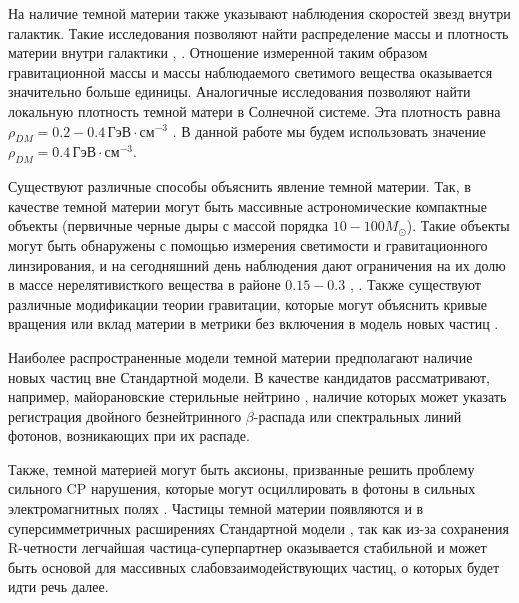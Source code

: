 На наличие темной материи также указывают наблюдения скоростей звезд внутри галактик. Такие исследования позволяют найти распределение массы и плотность материи внутри галактики \cite{Radial_velocity_measurements}, \cite{Angular_Velocity}. Отношение измеренной таким образом гравитационной массы и массы наблюдаемого светимого вещества оказывается значительно больше единицы. Аналогичные исследования позволяют найти локальную плотность темной матери в Солнечной системе. Эта плотность равна $\rho_{DM} = 0.2 - 0.4 \, \text{ГэВ} \cdot \text{см}^{-3}$ \cite{palau2022oblateness}. В данной работе мы будем использовать значение  $\rho_{DM} = 0.4 \,\text{ГэВ} \cdot  	\text{см}^{-3}$.


Существуют различные способы объяснить явление темной материи. Так, в качестве темной материи могут быть массивные астрономические компактные объекты (первичные черные дыры с массой порядка $10-100M_{\odot}$). Такие объекты могут быть обнаружены с помощью измерения светимости и гравитационного линзирования, и на сегодняшний день наблюдения дают ограничения на их долю в массе нерелятивисткого вещества в районе $0.15-0.3$ \cite{Zumalac_rregui_2018}, \cite{Blaineau_2022}.
Также существуют различные модификации теории гравитации, которые могут объяснить кривые вращения или вклад материи в метрики без включения в модель новых частиц \cite{1984ApJ...286....7B}.


Наиболее распространенные модели темной материи предполагают наличие новых частиц вне Стандартной модели. В качестве кандидатов рассматривают, например, майорановские стерильные нейтрино \cite{Boyarsky_2019}, наличие которых может указать регистрация двойного безнейтринного $\beta$-распада или спектральных линий фотонов, возникающих при их распаде. 

Также, темной материей могут быть аксионы, призванные решить проблему сильного CP нарушения, которые могут осциллировать в фотоны в сильных электромагнитных полях \cite{adams2023axion}. Частицы темной материи появляются и в суперсимметричных расширениях Стандартной модели \cite{berezinsky1996dark}, так как из-за сохранения R-четности легчайшая частица-суперпартнер оказывается стабильной и может быть основой для массивных слабовзаимодействующих частиц, о которых будет идти речь далее.


